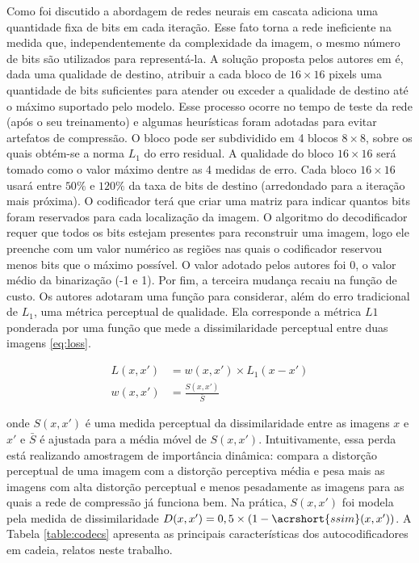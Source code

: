 Como foi discutido a abordagem de redes neurais em cascata adiciona uma quantidade fixa de bits em cada iteração. Esse fato torna a rede ineficiente na medida que, independentemente da complexidade da imagem, o mesmo número de bits são utilizados para representá-la.  A solução proposta pelos autores em \cite{Priming2017Johnston} é, dada uma qualidade de destino, atribuir a cada bloco de $16 \times 16$ pixels uma quantidade de bits suficientes para atender ou exceder a qualidade de destino até o máximo suportado pelo modelo.
Esse processo ocorre no tempo de teste da rede (após o seu treinamento) e algumas  heurísticas foram adotadas para evitar artefatos de compressão. O bloco pode ser subdividido em 4 blocos  $8 \times 8$, sobre os quais obtém-se a norma $L_1$ do erro residual. A qualidade do bloco $16 \times 16$ será tomado como o valor máximo dentre as 4 medidas de erro. Cada bloco $16 \times 16$ usará entre $50\%$ e $120\%$ da taxa de bits de destino (arredondado para a iteração mais próxima). 
O codificador terá que criar uma matriz para indicar quantos bits foram reservados para cada localização da imagem. O algoritmo do decodificador requer que todos os bits estejam presentes para reconstruir uma imagem, logo ele preenche com um valor numérico as regiões nas quais o codificador reservou menos bits que o máximo possível. O valor adotado pelos autores foi 0, o valor médio da binarização (-1 e 1). 
Por fim, a terceira mudança recaiu na função de custo. Os autores adotaram uma função para considerar, além do erro tradicional de $L_1$, uma métrica perceptual de qualidade. Ela corresponde a métrica $L1$ ponderada por uma função que mede a dissimilaridade perceptual entre duas imagens \ref{eq:loss}.    

\begin{equation}
\label{eq:loss}     
\begin{aligned}
L(x,x') &= w(x,x') \times L_1(x-x') \\ 
w(x,x') &= \frac{S(x,x')}{\bar{S}} 
\end{aligned}
\end{equation}

onde $S(x, x')$ é uma medida perceptual da dissimilaridade entre as imagens $x$ e $x'$ e  $\bar{S}$ é ajustada para a média móvel de $S(x,x')$. 
Intuitivamente, essa perda está realizando amostragem de importância dinâmica: compara a distorção perceptual de uma imagem com a distorção perceptiva média e pesa mais as imagens com alta distorção perceptual e menos pesadamente as imagens para as quais a rede de compressão já funciona bem.
Na prática, $S(x, x')$ foi modela pela medida de dissimilaridade $D(x, x') = 0,5 \times (1- \acrshort{ssim} (x, x'))$. 
A Tabela \ref{table:codecs} apresenta as principais características dos autocodificadores em cadeia, relatos neste trabalho.  

